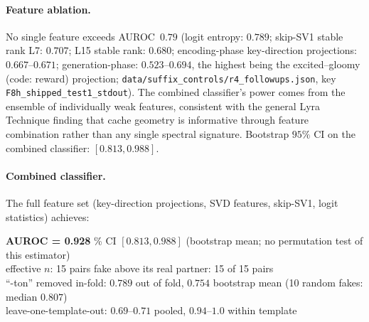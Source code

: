 \documentclass[11pt,a4paper]{article}
\begin{document}
\paragraph{Feature ablation.} No single feature exceeds AUROC~$0.79$
(logit entropy: $0.789$; skip-SV1 stable rank L7: $0.707$; L15 stable
rank: $0.680$; encoding-phase key-direction projections: $0.667$--$0.671$; generation-phase: $0.523$--$0.694$, the highest being the excited--gloomy (code: reward) projection; \texttt{data/suffix\_controls/r4\_followups.json}, key \texttt{F8h\_shipped\_test1\_stdout}). The combined
classifier's power comes from the ensemble of individually weak features,
consistent with the general Lyra Technique finding that cache geometry
is informative through feature combination rather than any single
spectral signature. Bootstrap $95\%$ CI on the combined classifier: $[0.813, 0.988]$.

\paragraph{Combined classifier.}

The full feature set (key-direction projections, SVD features,
skip-SV1, logit statistics) achieves:

\begin{center}
\textbf{AUROC = 0.928} \% CI $[0.813, 0.988]$ \quad
(bootstrap mean; no permutation test of this estimator)\\[2pt]
effective $n$: 15 pairs \quad fake above its real partner: 15 of 15 pairs\\[2pt]
``-ton'' removed in-fold: $0.789$ out of fold, $0.754$ bootstrap mean (10 random fakes: median $0.807$)\\[2pt]
leave-one-template-out: $0.69$--$0.71$ pooled, $0.94$--$1.0$ within template
\end{center}
\end{document}
